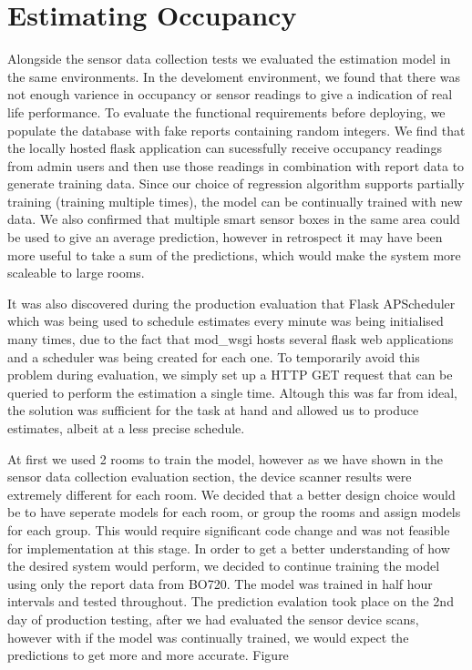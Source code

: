 \documentclass{l4proj}
\begin{document}
\section{Estimating Occupancy}

Alongside the sensor data collection tests we evaluated the estimation model in the same environments. In the develoment environment, we found that there was not enough varience in occupancy or sensor readings to give a indication of real life performance. To evaluate the functional requirements before deploying, we populate the database with fake reports containing random integers. We find that the locally hosted flask application can sucessfully receive occupancy readings from admin users and then use those readings in combination with report data to generate training data. Since our choice of regression algorithm supports partially training (training multiple times), the model can be continually trained with new data. We also confirmed that multiple smart sensor boxes in the same area could be used to give an average prediction, however in retrospect it may have been more useful to take a sum of the predictions, which would make the system more scaleable to large rooms.

It was also discovered during the production evaluation that Flask APScheduler which was being used to schedule estimates every minute was being initialised many times, due to the fact that mod\_wsgi hosts several flask web applications and a scheduler was being created for each one. To temporarily avoid this problem during evaluation, we simply set up a HTTP GET request that can be queried to perform the estimation a single time. Altough this was far from ideal, the solution was sufficient for the task at hand and allowed us to produce estimates, albeit at a less precise schedule. 

At first we used 2 rooms to train the model, however as we have shown in the sensor data collection evaluation section, the device scanner results were extremely different for each room. We decided that a better design choice would be to have seperate models for each room, or group the rooms and assign models for each group. This would require significant code change and was not feasible for implementation at this stage. In order to get a better understanding of how the desired system would perform, we decided to continue training the model using only the report data from BO720. The model was trained in half hour intervals and tested throughout. The prediction evalation took place on the 2nd day of production testing, after we had evaluated the sensor device scans, however with if the model was continually trained, we would expect the predictions to get more and more accurate. Figure 
\end{document}
